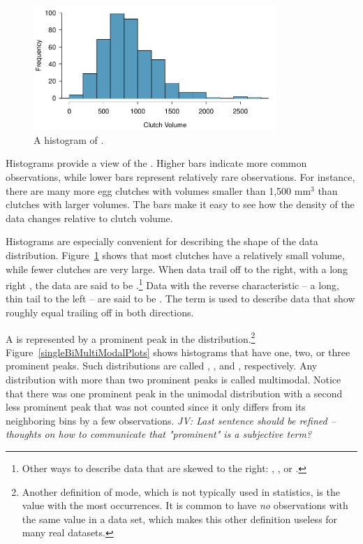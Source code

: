 \begin{doublespace}
\begin{figure}[ht]
	\centering
	\includegraphics[width=0.82\textwidth]{ch_intro_to_data_oi_biostat/figures/frogHist/frogHist}
	\caption{A histogram of .}
	\label{frogHist}
\end{figure}

Histograms provide a view of the . Higher bars indicate more common observations, while lower bars represent relatively rare observations. For instance, there are many more egg clutches with volumes smaller than 1,500 $\textrm{mm}^{3}$ than clutches with larger volumes. The bars make it easy to see how the density of the data changes relative to clutch volume.

Histograms are especially convenient for describing the shape of the data distribution\label{shapeFirstDiscussed}. Figure~\ref{frogHist} shows that most clutches have a relatively small volume, while fewer clutches are very large. When data trail off to the right, with a long right , the data are said to be .\footnote{Other ways to describe data that are skewed to the right: , , or .} Data with the reverse characteristic -- a long, thin tail to the left -- are said to be . The term  is used to describe data that show roughly equal trailing off in both directions.

A  is represented by a prominent peak in the distribution.\footnote{Another definition of mode, which is not typically used in statistics, is the value with the most occurrences. It is common to have \emph{no} observations with the same value in a data set, which makes this other definition useless for many real datasets.} Figure~\ref{singleBiMultiModalPlots} shows histograms that have one, two, or three prominent peaks. Such distributions are called , , and , respectively. Any distribution with more than two prominent peaks is called multimodal. Notice that there was one prominent peak in the unimodal distribution with a second less prominent peak that was not counted since it only differs from its neighboring bins by a few observations. \textit{JV: Last sentence should be refined -- thoughts on how to communicate that "prominent" is a subjective term?}


\end{doublespace}
